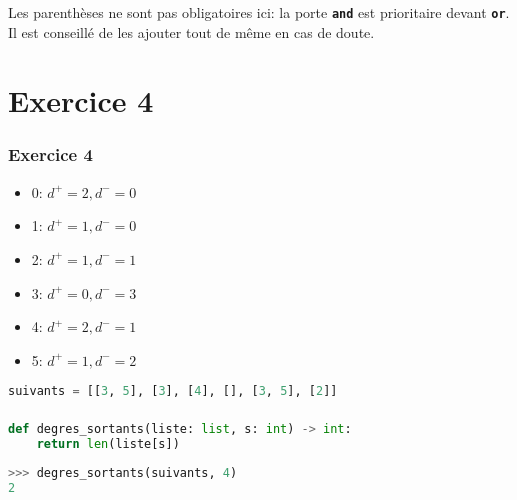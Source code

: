 \documentclass[svgnames,11pt]{beamer}
\begin{document}
\begin{frame}
    \frametitle{}

    \begin{aretenir}[Remarque]
    Les parenthèses ne sont pas obligatoires ici: la porte \textbf{\texttt{and}} est prioritaire devant \textbf{\texttt{or}}. Il est conseillé de les ajouter tout de même en cas de doute.
    \end{aretenir}

\end{frame}
\section{Exercice 4}
\begin{frame}[fragile]
    \frametitle{Exercice 4}


    \begin{itemize}
        \item 0: $d^+=2, d^-=0$
        \item 1: $d^+=1, d^-=0$
        \item 2: $d^+=1, d^-=1$
        \item 3: $d^+=0, d^-=3$
        \item 4: $d^+=2, d^-=1$
        \item 5: $d^+=1, d^-=2$
    \end{itemize}
    \begin{center}
\begin{lstlisting}[language=Python , basicstyle=\ttfamily\small, xleftmargin=1em, xrightmargin=0em]
suivants = [[3, 5], [3], [4], [], [3, 5], [2]]
\end{lstlisting}
\end{center}
\end{frame}
\begin{frame}[fragile]
    \frametitle{}

\begin{center}
\begin{lstlisting}[language=Python , basicstyle=\ttfamily\small, xleftmargin=1em, xrightmargin=0em]
def degres_sortants(liste: list, s: int) -> int:
    return len(liste[s])
\end{lstlisting}
\end{center}
\begin{center}
\begin{lstlisting}[language=Python , basicstyle=\ttfamily\small, xleftmargin=2em, xrightmargin=2em]
>>> degres_sortants(suivants, 4)
2
\end{lstlisting}
\label{CODE}
\end{center}
\end{frame}
\end{document}
